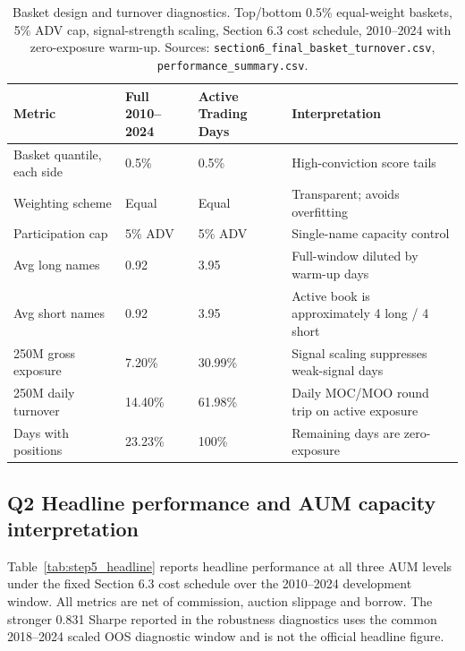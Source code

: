 \documentclass[12pt,a4paper]{article}
\begin{document}
\begin{table}[H]
\centering
\caption{Basket design and turnover diagnostics. Top/bottom 0.5\% equal-weight baskets, 5\% ADV cap, signal-strength scaling, Section 6.3 cost schedule, 2010--2024 with zero-exposure warm-up. Sources: \texttt{section6\_final\_basket\_turnover.csv}, \texttt{performance\_summary.csv}.}
\small
\begin{tabular}{p{4.0cm} p{2.5cm} p{2.8cm} p{5.2cm}}
\toprule
\textbf{Metric} & \textbf{Full 2010--2024} & \textbf{Active Trading Days} & \textbf{Interpretation} \\
\midrule
Basket quantile, each side & 0.5\% & 0.5\% & High-conviction score tails \\
Weighting scheme & Equal & Equal & Transparent; avoids overfitting \\
Participation cap & 5\% ADV & 5\% ADV & Single-name capacity control \\
Avg long names & 0.92 & 3.95 & Full-window diluted by warm-up days \\
Avg short names & 0.92 & 3.95 & Active book is approximately 4 long / 4 short \\
250M gross exposure & 7.20\% & 30.99\% & Signal scaling suppresses weak-signal days \\
250M daily turnover & 14.40\% & 61.98\% & Daily MOC/MOO round trip on active exposure \\
Days with positions & 23.23\% & 100\% & Remaining days are zero-exposure \\
\bottomrule
\end{tabular}
\end{table}

\subsection*{Q2 \quad Headline performance and AUM capacity interpretation}

Table~\ref{tab:step5_headline} reports headline performance at all three AUM
levels under the fixed Section 6.3 cost schedule over the 2010--2024 development
window. All metrics are net of commission, auction slippage and borrow. The
stronger 0.831 Sharpe reported in the robustness diagnostics uses the common
2018--2024 scaled OOS diagnostic window and is not the official headline figure.
\end{document}
